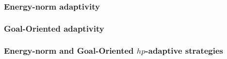\begin{frame}
	\frametitle{Energy-norm adaptivity}
	\begin{figure}[htp!]
	\end{figure}
\end{frame}
%
\begin{frame}
	\frametitle{Goal-Oriented adaptivity}
\end{frame}
%
%
%    
%

\begin{frame}
	\frametitle{Energy-norm and Goal-Oriented $hp$-adaptive strategies}
	\begin{figure}
	\end{figure}
\end{frame}